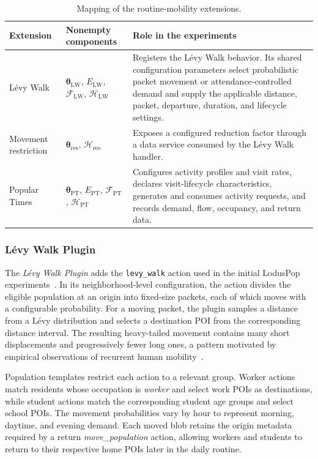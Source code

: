 \begin{table}[ht]
\centering
\footnotesize
\setlength{\tabcolsep}{4pt}
\caption{Mapping of the routine-mobility extensions.}
\label{tbl:routine_mobility_plugin_contract}
\begin{tabularx}{\linewidth}{@{}p{2.8cm}p{3.6cm}X@{}}
\toprule
\textbf{Extension} & \textbf{Nonempty components} & \textbf{Role in the experiments} \\
\midrule
L\'evy Walk
& $\bm{\theta}_{\mathrm{LW}}$, $E_{\mathrm{LW}}$, $\mathcal{F}_{\mathrm{LW}}$, $\mathcal{H}_{\mathrm{LW}}$
& Registers the L\'evy Walk behavior. Its shared configuration parameters select probabilistic packet movement or attendance-controlled demand and supply the applicable distance, packet, departure, duration, and lifecycle settings. \\
Movement restriction
& $\bm{\theta}_{\mathrm{res}}$, $\mathcal{H}_{\mathrm{res}}$
& Exposes a configured reduction factor through a data service consumed by the L\'evy Walk handler. \\
Popular Times
& $\bm{\theta}_{\mathrm{PT}}$, $E_{\mathrm{PT}}$, $\mathcal{F}_{\mathrm{PT}}$, $\mathcal{H}_{\mathrm{PT}}$
& Configures activity profiles and visit rates, declares visit-lifecycle characteristics, generates and consumes activity requests, and records demand, flow, occupancy, and return data. \\
\bottomrule
\end{tabularx}
\end{table}
\FloatBarrier

\subsubsection{L\'evy Walk Plugin}

The \textit{L\'evy Walk Plugin} adds the \texttt{levy\_walk} action used in the initial LodusPop experiments~\cite{silva2026lodusPop}. In its neighborhood-level configuration, the action divides the eligible population at an origin into fixed-size packets, each of which moves with a configurable probability. For a moving packet, the plugin samples a distance from a L\'evy distribution and selects a destination POI from the corresponding distance interval. The resulting heavy-tailed movement contains many short displacements and progressively fewer long ones, a pattern motivated by empirical observations of recurrent human mobility~\cite{gonzalez2008understanding}.

Population templates restrict each action to a relevant group. Worker actions match residents whose occupation is \textit{worker} and select work POIs as destinations, while student actions match the corresponding student age groups and select school POIs. The movement probabilities vary by hour to represent morning, daytime, and evening demand. Each moved blob retains the origin metadata required by a return \textit{move\_population} action, allowing workers and students to return to their respective home POIs later in the daily routine.


